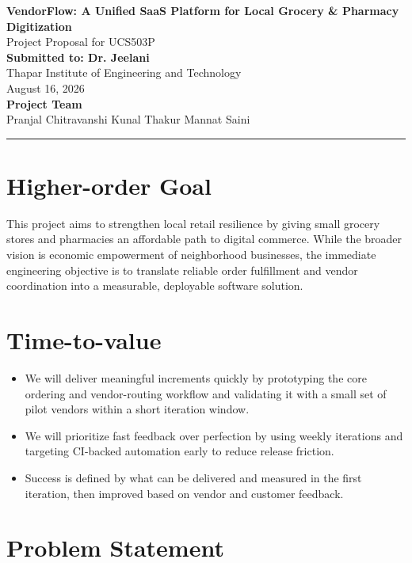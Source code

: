 \documentclass[11pt,a4paper]{article}
\begin{document}
\begin{center}
{\LARGE\bfseries\color{darkblue} VendorFlow: A Unified SaaS Platform for Local Grocery \& Pharmacy Digitization}\\[10pt]
{\large Project Proposal for UCS503P}\\[8pt]
\textbf{Submitted to: Dr. Jeelani}\\
Thapar Institute of Engineering and Technology\\
August 16, 2026\\[10pt]
\textbf{Project Team}\\
Pranjal Chitravanshi \quad Kunal Thakur \quad Mannat Saini
\end{center}

\hrule
\vspace{8pt}

\section{Higher-order Goal}

This project aims to strengthen local retail resilience by giving small grocery stores and
pharmacies an affordable path to digital commerce. While the broader vision is economic
empowerment of neighborhood businesses, the immediate engineering objective is to translate
reliable order fulfillment and vendor coordination into a measurable, deployable software
solution.

\section{Time-to-value}

\begin{itemize}[leftmargin=1.5em]
    \item We will deliver meaningful increments quickly by prototyping the core ordering and
    vendor-routing workflow and validating it with a small set of pilot vendors within a short
    iteration window.
    \item We will prioritize fast feedback over perfection by using weekly iterations and
    targeting CI-backed automation early to reduce release friction.
    \item Success is defined by what can be delivered and measured in the first iteration, then
    improved based on vendor and customer feedback.
\end{itemize}

\section{Problem Statement}
\end{document}
